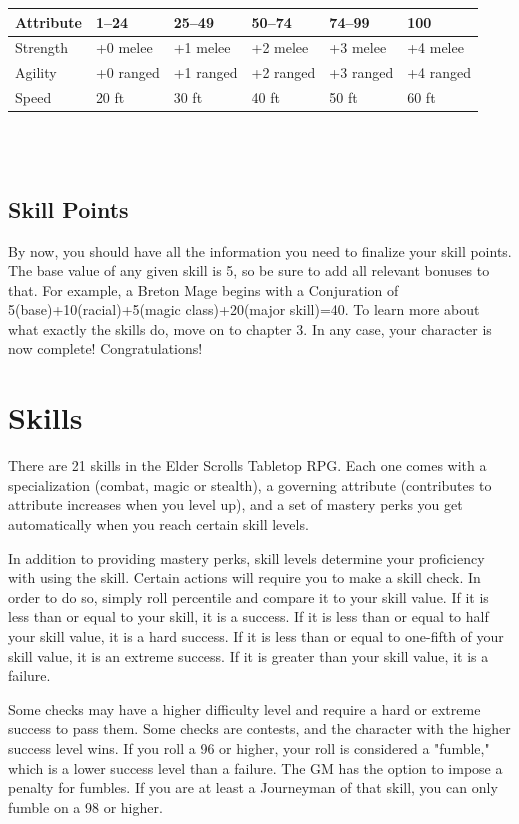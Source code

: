 \documentclass[12pt]{book}
\begin{document}
\begin{tabularx}{\textwidth}{|X|X|X|X|X|X|}
\hline
Attribute & 1--24 & 25--49 & 50--74 & 74--99 & 100\\ \hline
Strength & +0 melee & +1 melee & +2 melee & +3 melee & +4 melee\\ \hline
Agility & +0 ranged & +1 ranged & +2 ranged & +3 ranged & +4 ranged\\ \hline
Speed & 20 ft & 30 ft & 40 ft & 50 ft & 60 ft\\ \hline

\end{tabularx}\\~\\

\section{Skill Points}
By now, you should have all the information you need to finalize your skill points. The base value of any given skill is 5, so be sure to add all relevant bonuses to that. For example, a Breton Mage begins with a Conjuration of 5(base)+10(racial)+5(magic class)+20(major skill)=40. To learn more about what exactly the skills do, move on to chapter 3. In any case, your character is now complete! Congratulations!

\chapter{Skills}

There are 21 skills in the Elder Scrolls Tabletop RPG. Each one comes with a specialization (combat, magic or stealth), a governing attribute (contributes to attribute increases when you level up), and a set of mastery perks you get automatically when you reach certain skill levels.

In addition to providing mastery perks, skill levels determine your proficiency with using the skill. Certain actions will require you to make a skill check. In order to do so, simply roll percentile and compare it to your skill value. If it is less than or equal to your skill, it is a success. If it is less than or equal to half your skill value, it is a hard success. If it is less than or equal to one-fifth of your skill value, it is an extreme success. If it is greater than your skill value, it is a failure.

Some checks may have a higher difficulty level and require a hard or extreme success to pass them. Some checks are contests, and the character with the higher success level wins. If you roll a 96 or higher, your roll is considered a "fumble," which is a lower success level than a failure. The GM has the option to impose a penalty for fumbles. If you are at least a Journeyman of that skill, you can only fumble on a 98 or higher.
\end{document}
